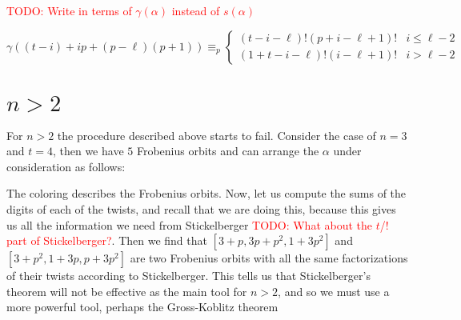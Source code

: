 \documentclass[12pt]{article}
\theoremstyle{customtheorem}%
\theoremstyle{remark}
\theoremstyle{definition}
\numberwithin{equation}{section}
\numberwithin{theorem}{section}
\begin{document}
\textcolor{red}{TODO: Write in terms of $\gamma(\alpha)$ instead of $s(\alpha)$}

\[ \gamma((t-i)+ip + (p - \ell)(p+1)) \equiv_p \begin{cases} (t-i-\ell)!(p+i-\ell+1)! & i \leq \ell -2 \\ (1+t-i-\ell)!(i-\ell+1)!& i > \ell -2 \end{cases}\]

\section{$n>2$}

For $n > 2$ the procedure described above starts to fail. Consider the case of $n = 3$ and $t = 4$, then we have $5$ Frobenius orbits and can arrange the $\alpha$ under consideration as follows:

The coloring describes the Frobenius orbits. Now, let us compute the sums of the digits of each of the twists, and recall that we are doing this, because this gives us all the information we need from Stickelberger \textcolor{red}{TODO: What about the $t$/$!$ part of Stickelberger?}. Then we find that $[3+p,3p+p^2,1+3p^2]$ and $[3+p^2, 1+3p, p+3p^2]$ are two Frobenius orbits with all the same factorizations of their twists according to Stickelberger. This tells us that Stickelberger's theorem will not be effective as the main tool for $n > 2$, and so we must use a more powerful tool, perhaps the Gross-Koblitz theorem

%
%
\end{document}
